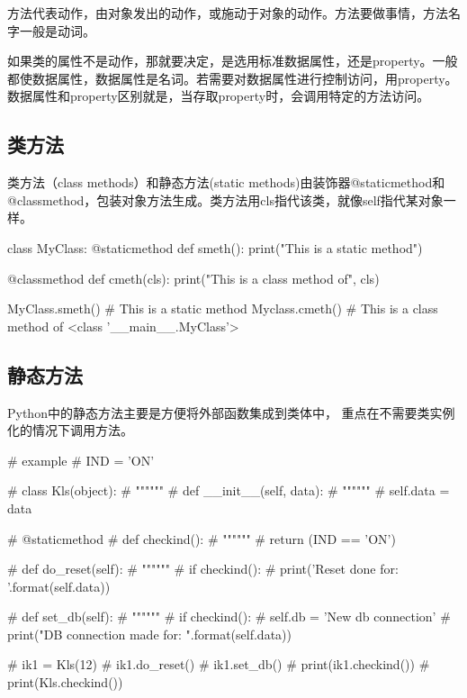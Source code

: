 方法代表动作，由对象发出的动作，或施动于对象的动作。方法要做事情，方法名字一般是动词。

如果类的属性不是动作，那就要决定，是选用标准数据属性，还是property。一般都使数据属性，数据属性是名词。若需要对数据属性进行控制访问，用property。数据属性和property区别就是，当存取property时，会调用特定的方法访问。


\subsection{类方法}
类方法（class methods）和静态方法(static methods)由装饰器@staticmethod和@classmethod，包装对象方法生成。类方法用cls指代该类，就像self指代某对象一样。
\begin{python}
class MyClass:
    @staticmethod
    def smeth():
        print("This is a static method")

    @classmethod
    def cmeth(cls):
        print("This is a class method of", cls)

MyClass.smeth()
# This is a static method
Myclass.cmeth()
# This is a class method of <class '__main__.MyClass'>
\end{python}
\subsection{静态方法}
Python中的静态方法主要是方便将外部函数集成到类体中， 重点在不需要类实例化的情况下调用方法。
\begin{python}
# example
# IND = 'ON'

# class Kls(object):
#     """"""
#     def __init__(self, data):
#         """"""
#         self.data = data

#     @staticmethod
#     def checkind():
#         """"""
#         return (IND == 'ON')

#     def do_reset(self):
#         """"""
#         if checkind():
#             print('Reset done for: {}'.format(self.data))

#     def set_db(self):
#         """"""
#         if checkind():
#             self.db = 'New db connection'
#             print("DB connection made for: {}".format(self.data))

# ik1 = Kls(12)
# ik1.do_reset()
# ik1.set_db()
# print(ik1.checkind())
# print(Kls.checkind())
\end{python}

